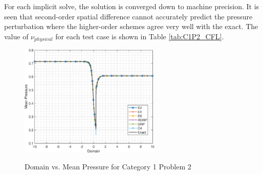 \documentclass[conf]{new-aiaa}
\begin{document}
For each implicit solve, the solution is converged down to machine precision. It is seen that second-order spatial difference cannot accurately predict the pressure perturbation where the higher-order schemes agree very well with the exact. 
The value of $\nu_{physical}$ for each test case is shown in Table \ref{tab:C1P2_CFL}.   

\begin{figure}[hbtp!]
	\centering
	{\includegraphics[width=0.6\textwidth]{C1P2_SteadyState}}
	\caption{Domain vs. Mean Pressure for Category 1 Problem 2}
	\label{fig:C1P2_SteadyState}
\end{figure}
\end{document}
